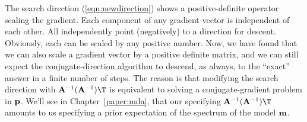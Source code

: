 \par
The search direction (\ref{eqn:newdirection}) 
shows a positive-definite operator scaling the gradient.
Each component of any gradient vector is independent of each other.
All independently point (negatively) to a direction for descent.
Obviously, each can be scaled by any positive number.
Now, we have found that we can also scale a gradient vector by
a positive definite matrix, and we can still expect
the conjugate-direction algorithm to descend, as always,
to the ``exact'' answer in a finite number of steps.
The reason is that modifying the search direction with
$ \bold A^{-1} (\bold A^{-1})\T$ is equivalent to solving
a conjugate-gradient problem in $\bold p$.
We'll see in Chapter~\ref{paper:mda}, that
our specifying $ \bold A^{-1} (\bold A^{-1})\T$
amounts to us specifying
a prior expectation
of the spectrum of the model $\bold m$.


%

